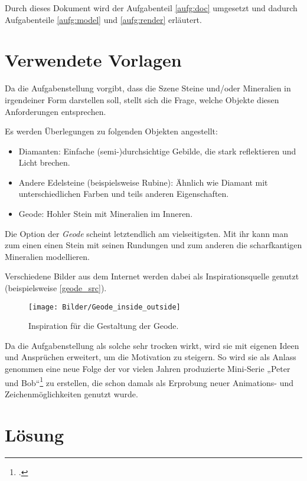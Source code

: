 \documentclass{scrreprt}
\begin{document}
Durch dieses Dokument wird der Aufgabenteil \ref{aufg:doc} umgesetzt und dadurch Aufgabenteile \ref{aufg:model} und \ref{aufg:render} erläutert.


\chapter{Verwendete Vorlagen}

Da die Aufgabenstellung vorgibt, dass die Szene Steine und/oder Mineralien in irgendeiner Form darstellen soll, stellt sich die Frage, welche Objekte diesen Anforderungen entsprechen. 

Es werden Überlegungen zu folgenden Objekten angestellt:
\begin{itemize}
\item Diamanten: Einfache (semi-)durchsichtige Gebilde, die stark reflektieren und Licht brechen.
\item Andere Edelsteine (beispielsweise Rubine): Ähnlich wie Diamant mit unterschiedlichen Farben und teils anderen Eigenschaften.
\item Geode: Hohler Stein mit Mineralien im Inneren.
\end{itemize}

Die Option der \emph{Geode} scheint letztendlich am vielseitigsten. Mit ihr kann man zum einen einen Stein mit seinen Rundungen und zum anderen die scharfkantigen Mineralien modellieren.

Verschiedene Bilder aus dem Internet werden dabei als Inspirationsquelle genutzt (beispielsweise \autoref{geode_src}).

\begin{figure}[!ht]
\centering
\texttt{[image: Bilder/Geode\_inside\_outside]}
\caption[Inspiration für die Gestaltung der Geode.]{Inspiration für die Gestaltung der Geode\protect\footnotemark .}
\label{geode_src}
\end{figure}

Da die Aufgabenstellung als solche sehr trocken wirkt, wird sie mit eigenen Ideen und Ansprüchen erweitert, um die Motivation zu steigern. So wird sie als Anlass genommen eine neue Folge der vor vielen Jahren produzierte Mini-Serie „Peter und Bob“\footcite{Strube2017yt} zu erstellen, die schon damals als Erprobung neuer Animations- und Zeichenmöglichkeiten genutzt wurde.

\chapter{Lösung}
\end{document}
